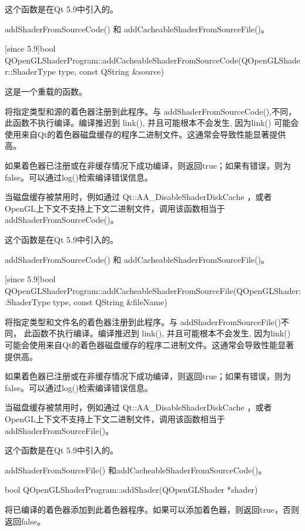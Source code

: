 这个函数是在Qt 5.9中引入的。

\begin{seeAlso}
addShaderFromSourceCode() 和 addCacheableShaderFromSourceFile()。
\end{seeAlso}

[since 5.9]bool QOpenGLShaderProgram::addCacheableShaderFromSourceCode(QOpenGLShader::ShaderType type, const QString \&source)

这是一个重载的函数。

将指定类型和源的着色器注册到此程序。与 addShaderFromSourceCode(),不同，此函数不执行编译。编译推迟到 link(), 并且可能根本不会发生, 因为link() 可能会使用来自Qt的着色器磁盘缓存的程序二进制文件。这通常会导致性能显著提供高。

如果着色器已注册或在非缓存情况下成功编译，则返回true；如果有错误，则为false。可以通过log()检索编译错误信息。

当磁盘缓存被禁用时，例如通过 Qt::AA\_DisableShaderDiskCache ，或者OpenGL上下文不支持上下文二进制文件，调用该函数相当于addShaderFromSourceCode()。

这个函数是在Qt 5.9中引入的。

\begin{seeAlso}
addShaderFromSourceCode() 和 addCacheableShaderFromSourceFile()。
\end{seeAlso}

[since 5.9]bool QOpenGLShaderProgram::addCacheableShaderFromSourceFile(QOpenGLShader::ShaderType type, const QString \&fileName)

将指定类型和文件名的着色器注册到此程序。与 addShaderFromSourceFile()不同， 此函数不执行编译。编译推迟到 link(), 并且可能根本不会发生, 因为link() 可能会使用来自Qt的着色器磁盘缓存的程序二进制文件。这通常会导致性能显著提供高。

如果着色器已注册或在非缓存情况下成功编译，则返回true；如果有错误，则为false。可以通过log()检索编译错误信息。

当磁盘缓存被禁用时，例如通过 Qt::AA\_DisableShaderDiskCache ，或者OpenGL上下文不支持上下文二进制文件，调用该函数相当于 addShaderFromSourceFile()。

这个函数是在Qt 5.9中引入的。

\begin{seeAlso}
addShaderFromSourceFile() 和addCacheableShaderFromSourceCode()。
\end{seeAlso}

bool QOpenGLShaderProgram::addShader(QOpenGLShader *shader)

将已编译的着色器添加到此着色器程序。如果可以添加着色器，则返回true，否则返回false。

